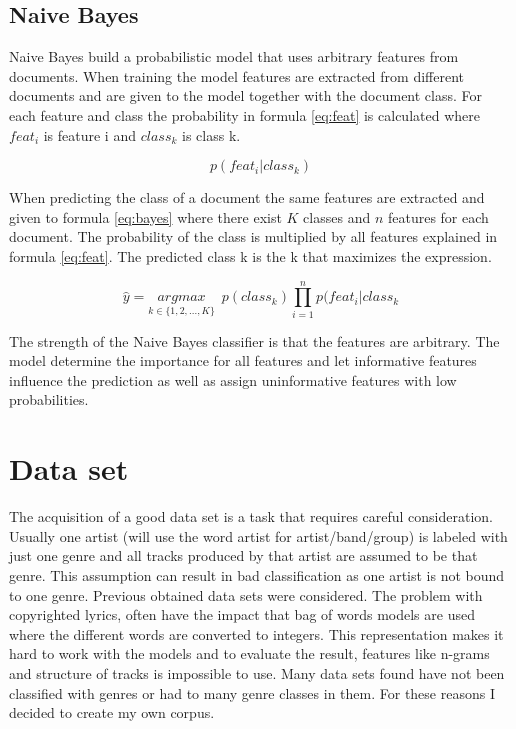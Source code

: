 \documentclass[a4paper, 12pt]{article}
\begin{document}
\subsection{Naive Bayes}
Naive Bayes build a probabilistic model that uses arbitrary features from documents.
When training the model features are extracted from different documents and are given to the model together with the document class.
For each feature and class the probability in formula \ref{eq:feat} is calculated where $ feat_{i}$ is feature i and $ class_k $ is class k.

\large
\begin{equation}
    p (feat_{i}|class_{k})
    \label{eq:feat}
\end{equation}
\normalsize

When predicting the class of a document the same features are extracted and given to formula \ref{eq:bayes} where there exist $K$ classes and $n$ features for each document.
The probability of the class is multiplied by all features explained in formula \ref{eq:feat}.
The predicted class k is the k that maximizes the expression.

\large
\begin{equation}
    \hat{y} = \underset{k \in \{1,2,...,K\}}{argmax} \, \, \, p(class_{k}) \prod_{i=1}^{n} p (feat_{i}|class_{k}
    \label{eq:bayes}
\end{equation}
\normalsize

The strength of the Naive Bayes classifier is that the features are arbitrary.
The model determine the importance for all features and let informative features influence the prediction as well as assign uninformative features with low probabilities. \cite{tm-lecture} \cite{rish2001empirical}

\section{Data set}
\label{sec:dataset}
The acquisition of a good data set is a task that requires careful consideration.
Usually one artist (will use the word artist for artist/band/group) is labeled with just one genre and all tracks produced by that artist are assumed to be that genre.
This assumption can result in bad classification as one artist is not bound to one genre.
Previous obtained data sets were considered.
The problem with copyrighted lyrics, often have the impact that bag of words models are used where the different words are converted to integers. \cite{million}
This representation makes it hard to work with the models and to evaluate the result, features like n-grams and structure of tracks is impossible to use.
Many data sets found have not been classified with genres or had to many genre classes in them.
For these reasons I decided to create my own corpus.
\end{document}
